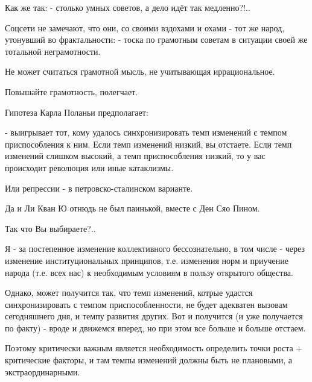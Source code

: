 Как же так: 
- столько умных советов, а дело идёт так медленно?!..

Соцсети не замечают, что они, со своими вздохами и охами - тот же народ, утонувший во фрактальности:
- тоска по грамотным советам в ситуации своей же тотальной неграмотности.

Не может считаться грамотной мысль, не учитывающая иррациональное. 

Повышайте грамотность, полегчает.

Гипотеза Карла Поланьи предполагает:

- выигрывает тот, кому удалось синхронизировать темп изменений с темпом
приспособления к ним. Если темп изменений низкий, вы отстаете. Если темп
изменений слишком высокий, а темп приспособления низкий, то у вас происходит
революция или иные катаклизмы.

Или репрессии - в петровско-сталинском варианте.

Да и Ли Кван Ю отнюдь не был паинькой, вместе с Ден Сяо Пином.

Так что Вы выбираете?..

Я - за постепенное изменение коллективного бессознательно, в том числе - через
изменение институциональных принципов, т.е. изменения норм и приучение народа
(т.е. всех нас) к необходимым условиям в пользу открытого общества.

Однако, может получится так, что темп изменений, котрые удастся
синхронизировать с темпом приспособленности, не будет адекватен вызовам
сегодняшнего дня, и темпу развития других. Вот и получится (и уже получается по
факту) - вроде и движемся вперед, но при этом все больше и больше отстаем.

Поэтому критически важным является необходимость определить точки роста +
критические факторы, и там темпы изменений должны быть не плановыми, а
экстраординарными.



